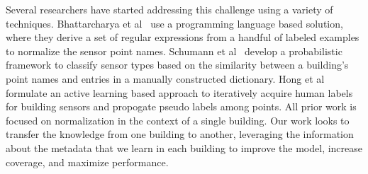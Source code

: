 Several researchers have started addressing this challenge using a variety of techniques.
Bhattarcharya et al~\cite{arka} use a programming language based solution, 
where they derive a set of regular expressions from a handful of labeled examples 
to normalize the sensor point names. 
Schumann et al~\cite{ibm} develop a probabilistic framework to classify sensor types 
based on the similarity between a building's point names and entries in a manually constructed dictionary. 
Hong et al~\cite{cikm} formulate an active learning based approach to iteratively 
acquire human labels for building sensors and propogate pseudo labels among points.
All prior work is focused on normalization in the context of a single building.  Our work looks to 
transfer the knowledge from one building to another, leveraging the information about the metadata that
we learn in each building to improve the model, increase coverage, and maximize performance.




